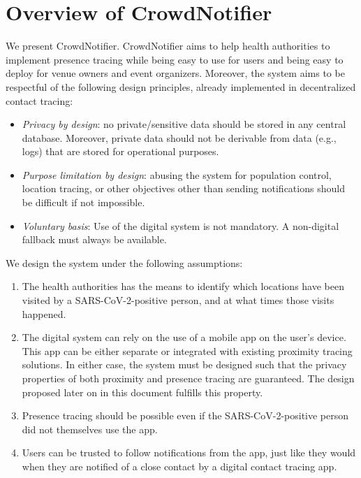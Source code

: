 \section{Overview of CrowdNotifier}

We present CrowdNotifier. CrowdNotifier aims to help health authorities to implement presence tracing while being easy to use for users and being easy to deploy for venue owners and event organizers. Moreover, the system aims to be respectful of the following design principles, already implemented in decentralized contact tracing:

\begin{itemize}
\item \textit{Privacy by design}: no private/sensitive data should be stored in any central database. Moreover, private data should not be derivable from data (e.g., logs) that are stored for operational purposes.
\item \textit{Purpose limitation by design}: abusing the system for population control, location tracing, or other objectives other than sending notifications should be difficult if not impossible.
\item \textit{Voluntary basis}: Use of the digital system is not mandatory. A non-digital fallback must always be available.
\end{itemize}

We design the system under the following assumptions:

\begin{enumerate}
\item The health authorities has the means to identify which locations have been visited by a SARS-CoV-2-positive person, and at what times those visits happened.
\item The digital system can rely on the use of a mobile app on the user’s device. This app can be either separate or integrated with existing proximity tracing solutions. In either case, the system must be designed such that the privacy properties of both proximity and presence tracing  are guaranteed. The design proposed later on in this document fulfills this property.
\item Presence tracing should be possible even if the SARS-CoV-2-positive person did not themselves use the app.
\item Users can be trusted to follow notifications from the app, just like they would when they are notified of a close contact by a digital contact tracing app.
\end{enumerate}

